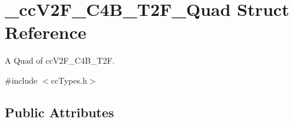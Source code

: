 \hypertarget{struct__cc_v2_f___c4_b___t2_f___quad}{\section{\-\_\-cc\-V2\-F\-\_\-\-C4\-B\-\_\-\-T2\-F\-\_\-\-Quad Struct Reference}
\label{struct__cc_v2_f___c4_b___t2_f___quad}
}


A Quad of cc\-V2\-F\-\_\-\-C4\-B\-\_\-\-T2\-F.  




{\ttfamily \#include $<$cc\-Types.\-h$>$}

\subsection*{Public Attributes}
